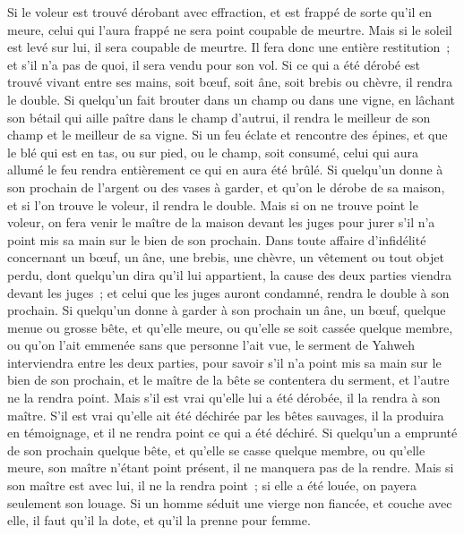 \begin{multicols}{2}
Si le voleur est trouvé dérobant avec effraction, et est frappé de sorte qu'il en meure, celui qui l'aura frappé ne sera point coupable de meurtre.
Mais si le soleil est levé sur lui, il sera coupable de meurtre. Il fera donc une entière restitution~; et s'il n'a pas de quoi, il sera vendu pour son vol.
Si ce qui a été dérobé est trouvé vivant entre ses mains, soit bœuf, soit âne, soit brebis ou chèvre, il rendra le double.
Si quelqu'un fait brouter dans un champ ou dans une vigne, en lâchant son bétail qui aille paître dans le champ d'autrui, il rendra le meilleur de son champ et le meilleur de sa vigne.
Si un feu éclate et rencontre des épines, et que le blé qui est en tas, ou sur pied, ou le champ, soit consumé, celui qui aura allumé le feu rendra entièrement ce qui en aura été brûlé.
Si quelqu'un donne à son prochain de l'argent ou des vases à garder, et qu'on le dérobe de sa maison, et si l'on trouve le voleur, il rendra le double.
Mais si on ne trouve point le voleur, on fera venir le maître de la maison devant les juges pour jurer s'il n'a point mis sa main sur le bien de son prochain.
Dans toute affaire d'infidélité concernant un bœuf, un âne, une brebis, une chèvre, un vêtement ou tout objet perdu, dont quelqu'un dira qu'il lui appartient, la cause des deux parties viendra devant les juges~; et celui que les juges auront condamné, rendra le double à son prochain.
Si quelqu'un donne à garder à son prochain un âne, un bœuf, quelque menue ou grosse bête, et qu'elle meure, ou qu'elle se soit cassée quelque membre, ou qu'on l'ait emmenée sans que personne l'ait vue,
le serment de Yahweh interviendra entre les deux parties, pour savoir s'il n'a point mis sa main sur le bien de son prochain, et le maître de la bête se contentera du serment, et l'autre ne la rendra point.
Mais s'il est vrai qu'elle lui a été dérobée, il la rendra à son maître.
S'il est vrai qu'elle ait été déchirée par les bêtes sauvages, il la produira en témoignage, et il ne rendra point ce qui a été déchiré.
Si quelqu'un a emprunté de son prochain quelque bête, et qu'elle se casse quelque membre, ou qu'elle meure, son maître n'étant point présent, il ne manquera pas de la rendre.
Mais si son maître est avec lui, il ne la rendra point~; si elle a été louée, on payera seulement son louage.
Si un homme séduit une vierge non fiancée, et couche avec elle, il faut qu'il la dote, et qu'il la prenne pour femme.

\end{multicols}
